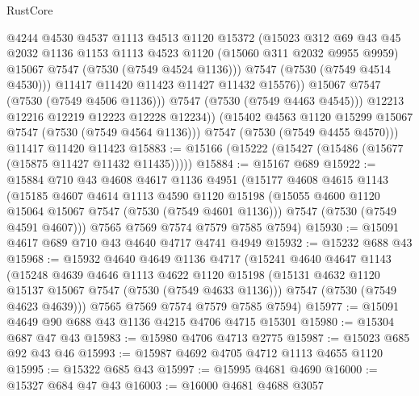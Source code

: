 \begin{lexlean}{RustCore}
\begin{coremodule}
                    @4244
                    @4530
                    @4537
                    @1113
                    @4513
                    @1120
                    @15372
                    (@15023
                      @312
                      @69
                      @43
                      @45
                      @2032
                      @1136
                      @1153
                      @1113
                      @4523
                      @1120
                      (@15060 @311 @2032 @9955 @9959)
                      @15067
                      @7547
                      (@7530 (@7549 @4524 @1136)))
                    @7547
                    (@7530 (@7549 @4514 @4530)))
                  @11417
                  @11420
                  @11423
                  @11427
                  @11432
                  @15576))
              @15067
              @7547
              (@7530 (@7549 @4506 @1136)))
            @7547
            (@7530 (@7549 @4463 @4545)))
          @12213
          @12216
          @12219
          @12223
          @12228
          @12234))
      (@15402 @4563 @1120 @15299 @15067 @7547 (@7530 (@7549 @4564 @1136)))
      @7547
      (@7530 (@7549 @4455 @4570)))
    @11417
    @11420
    @11423
@15883 := @15166 (@15222 (@15427 (@15486 (@15677 (@15875 @11427 @11432 @11435)))))
@15884 := @15167 @689
@15922 := @15884
    @710
    @43
    @4608
    @4617
    @1136
    @4951
    (@15177
      @4608
      @4615
      @1143
      (@15185
        @4607
        @4614
        @1113
        @4590
        @1120
        @15198
        (@15055 @4600 @1120 @15064 @15067 @7547 (@7530 (@7549 @4601 @1136)))
        @7547
        (@7530 (@7549 @4591 @4607)))
      @7565
      @7569
      @7574
      @7579
      @7585
      @7594)
@15930 := @15091 @4617 @689 @710 @43 @4640 @4717 @4741 @4949
@15932 := @15232 @688 @43
@15968 := @15932
    @4640
    @4649
    @1136
    @4717
    (@15241
      @4640
      @4647
      @1143
      (@15248
        @4639
        @4646
        @1113
        @4622
        @1120
        @15198
        (@15131 @4632 @1120 @15137 @15067 @7547 (@7530 (@7549 @4633 @1136)))
        @7547
        (@7530 (@7549 @4623 @4639)))
      @7565
      @7569
      @7574
      @7579
      @7585
      @7594)
@15977 := @15091 @4649 @90 @688 @43 @1136 @4215 @4706 @4715 @15301
@15980 := @15304 @687 @47 @43
@15983 := @15980 @4706 @4713 @2775
@15987 := @15023 @685 @92 @43 @46
@15993 := @15987 @4692 @4705 @4712 @1113 @4655 @1120
@15995 := @15322 @685 @43
@15997 := @15995 @4681 @4690
@16000 := @15327 @684 @47 @43
@16003 := @16000 @4681 @4688 @3057

\end{coremodule}
\end{lexlean}
